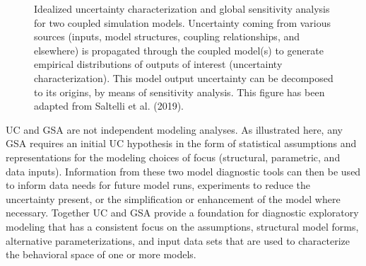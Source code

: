 \documentclass[letterpaper,10pt,english]{sphinxmanual}
\let\sphinxpxdimen\pdfpxdimen\else\newdimen\sphinxpxdimen
\begin{document}
\begin{figure}[htbp]
\centering
\capstart

\noindent\sphinxincludegraphics[width=700\sphinxpxdimen]{{figure2_idealized_uc}.png}
\caption{Idealized uncertainty characterization and global sensitivity analysis for two coupled simulation models. Uncertainty coming from various sources (inputs, model structures, coupling relationships, and elsewhere) is propagated through the coupled model(s) to generate empirical distributions of outputs of interest (uncertainty characterization). This model output uncertainty can be decomposed to its origins, by means of sensitivity analysis. This figure has been adapted from Saltelli et al. (2019).}\label{\detokenize{2_diagnostic_modeling_overview_and_perspectives:id1}}\end{figure}

\sphinxAtStartPar
UC and GSA are not independent modeling analyses. As illustrated here, any GSA requires an initial UC hypothesis in the form of statistical assumptions and representations for the modeling choices of focus (structural, parametric, and data inputs). Information from these two model diagnostic tools can then be used to inform data needs for future model runs, experiments to reduce the uncertainty present, or the simplification or enhancement of the model where necessary. Together UC and GSA provide a foundation for diagnostic exploratory modeling that has a consistent focus on the assumptions, structural model forms, alternative parameterizations, and input data sets that are used to characterize the behavioral space of one or more models.
\end{document}

